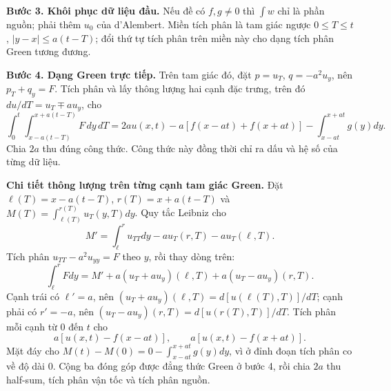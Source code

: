 \documentclass[10pt,a4paper]{article}
\begin{document}
\textbf{Bước 3. Khôi phục dữ liệu đầu.} Nếu đề có $f,g\ne0$ thì $\int w$ chỉ là phần nguồn; phải thêm $u_0$ của d'Alembert. Miền tích phân là tam giác ngược $0\le T\le t$, $|y-x|\le a(t-T)$; đổi thứ tự tích phân trên miền này cho dạng tích phân Green tương đương.

\textbf{Bước 4. Dạng Green trực tiếp.} Trên tam giác đó, đặt $p=u_T$, $q=-a^2u_y$, nên $p_T+q_y=F$. Tích phân và lấy thông lượng hai cạnh đặc trưng, trên đó $du/dT=u_T\mp au_y$, cho
\[\int_0^t\int_{x-a(t-T)}^{x+a(t-T)}F\,dy\,dT
=2au(x,t)-a[f(x-at)+f(x+at)]-\int_{x-at}^{x+at}g(y)dy.\]
Chia $2a$ thu đúng công thức. Công thức này đồng thời chỉ ra dấu và hệ số của từng dữ liệu.

\textbf{Chi tiết thông lượng trên từng cạnh tam giác Green.} Đặt $\ell(T)=x-a(t-T)$, $r(T)=x+a(t-T)$ và $M(T)=\int_{\ell(T)}^{r(T)}u_T(y,T)dy$. Quy tắc Leibniz cho
\[M'=\int_\ell^r u_{TT}dy-a u_T(r,T)-a u_T(\ell,T).\]
Tích phân $u_{TT}-a^2u_{yy}=F$ theo $y$, rồi thay dòng trên:
\[\int_\ell^r Fdy=M'+a(u_T+a u_y)(\ell,T)+a(u_T-a u_y)(r,T).\]
Cạnh trái có $\ell'=a$, nên $(u_T+a u_y)(\ell,T)=d[u(\ell(T),T)]/dT$; cạnh phải có $r'=-a$, nên $(u_T-a u_y)(r,T)=d[u(r(T),T)]/dT$. Tích phân mỗi cạnh từ $0$ đến $t$ cho
\[a[u(x,t)-f(x-at)],\qquad a[u(x,t)-f(x+at)].\]
Mặt đáy cho $M(t)-M(0)=0-\int_{x-at}^{x+at}g(y)dy$, vì ở đỉnh đoạn tích phân co về độ dài $0$. Cộng ba đóng góp được đẳng thức Green ở bước 4, rồi chia $2a$ thu half-sum, tích phân vận tốc và tích phân nguồn.
\end{document}

